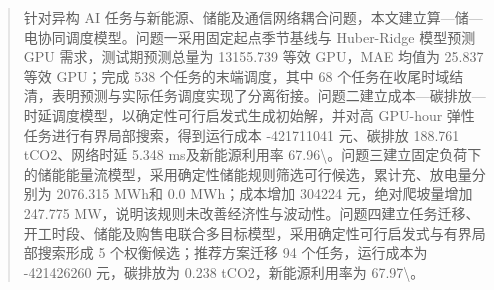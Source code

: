 \begin{abstract}
针对异构 AI 任务与新能源、储能及通信网络耦合问题，本文建立算—储—电协同调度模型。问题一采用固定起点季节基线与 Huber-Ridge 模型预测 GPU 需求，测试期预测总量为 13155.739 等效 GPU，MAE 均值为 25.837 等效 GPU；完成 538 个任务的末端调度，其中 68 个任务在收尾时域结清，表明预测与实际任务调度实现了分离衔接。问题二建立成本—碳排放—时延调度模型，以确定性可行启发式生成初始解，并对高 GPU-hour 弹性任务进行有界局部搜索，得到运行成本 -421711041 元、碳排放 188.761 tCO2、网络时延 5.348 ms及新能源利用率 67.96\textbackslash{}。问题三建立固定负荷下的储能能量流模型，采用确定性储能规则筛选可行候选，累计充、放电量分别为 2076.315 MWh和 0.0 MWh；成本增加 304224 元，绝对爬坡量增加 247.775 MW，说明该规则未改善经济性与波动性。问题四建立任务迁移、开工时段、储能及购售电联合多目标模型，采用确定性可行启发式与有界局部搜索形成 5 个权衡候选；推荐方案迁移 94 个任务，运行成本为 -421426260 元，碳排放为 0.238 tCO2，新能源利用率为 67.97\textbackslash{}。
\end{abstract}
